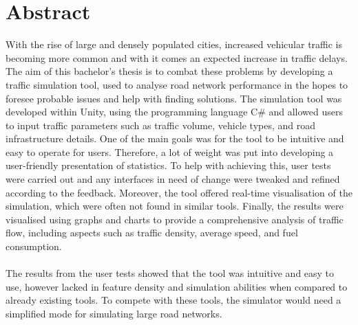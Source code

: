 


\thispagestyle{plain} 
\setlength{\parskip}{0pt plus 1.0pt}
\section*{Abstract}
    With the rise of large and densely populated cities, increased vehicular traffic is becoming more common and with it comes an expected increase in traffic delays. The aim of this bachelor's thesis is to combat these problems by developing a traffic simulation tool, used to analyse road network performance in the hopes to foresee probable issues and help with finding solutions. The simulation tool was developed within Unity, using the programming language C\# and allowed users to input traffic parameters such as traffic volume, vehicle types, and road infrastructure details. One of the main goals was for the tool to be intuitive and easy to operate for users. Therefore, a lot of weight was put into developing a user-friendly presentation of statistics. To help with achieving this, user tests were carried out and any interfaces in need of change were tweaked and refined according to the feedback. Moreover, the tool offered real-time visualisation of the simulation, which were often not found in similar tools. Finally, the results were visualised using graphs and charts to provide a comprehensive analysis of traffic flow, including aspects such as traffic density, average speed, and fuel consumption.
    \\\\
    The results from the user tests showed that the tool was intuitive and easy to use, however lacked in feature density and simulation abilities when compared to already existing tools. To compete with these tools, the simulator would need a simplified mode for simulating large road networks.

\newpage
